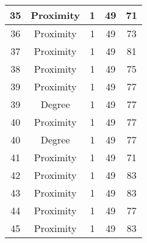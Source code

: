 \documentclass[results.tex]{subfiles}
\begin{document}
\begin{center}
\begin{tabular}{| c || c | c | c | c |}
            \hline
            35                      & Proximity                    & 1                      & 49                      & 71                   \\
            \hline
            36                      & Proximity                    & 1                      & 49                      & 73                   \\
            \hline
            37                      & Proximity                    & 1                      & 49                      & 81                   \\
            \hline
            38                      & Proximity                    & 1                      & 49                      & 75                   \\
            \hline
            39                      & Proximity                    & 1                      & 49                      & 77                   \\
            \hline
            39                      & Degree                       & 1                      & 49                      & 77                   \\
            \hline
            40                      & Proximity                    & 1                      & 49                      & 77                   \\
            \hline
            40                      & Degree                       & 1                      & 49                      & 77                   \\
            \hline
            41                      & Proximity                    & 1                      & 49                      & 71                   \\
            \hline
            42                      & Proximity                    & 1                      & 49                      & 83                   \\
            \hline
            43                      & Proximity                    & 1                      & 49                      & 83                   \\
            \hline
            44                      & Proximity                    & 1                      & 49                      & 77                   \\
            \hline
            45                      & Proximity                    & 1                      & 49                      & 83                   \\

\end{tabular}
\end{center}
\end{document}
